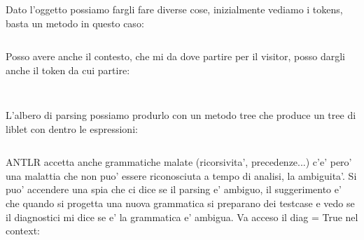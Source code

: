 Dato l'oggetto possiamo fargli fare diverse cose, inizialmente vediamo i tokens, basta un metodo in questo caso:
\begin{lstlisting}

\end{lstlisting}

Posso avere anche il contesto, che mi da dove partire per il visitor, posso dargli anche il token da cui partire:
\begin{lstlisting}


\end{lstlisting}

L'albero di parsing possiamo produrlo con un metodo tree che produce un tree di liblet con dentro le espressioni:
\begin{lstlisting}

\end{lstlisting}

ANTLR accetta anche grammatiche malate (ricorsivita', precedenze...) c'e' pero' una malattia che non puo' essere riconosciuta a tempo di analisi, la ambiguita'. Si puo' accendere una spia che ci dice se il parsing e' ambiguo, il suggerimento e' che quando si progetta una nuova grammatica si preparano dei testcase e vedo se il diagnostici mi dice se e' la grammatica e' ambigua. Va acceso il diag = True nel context:
\begin{lstlisting}

\end{lstlisting}

